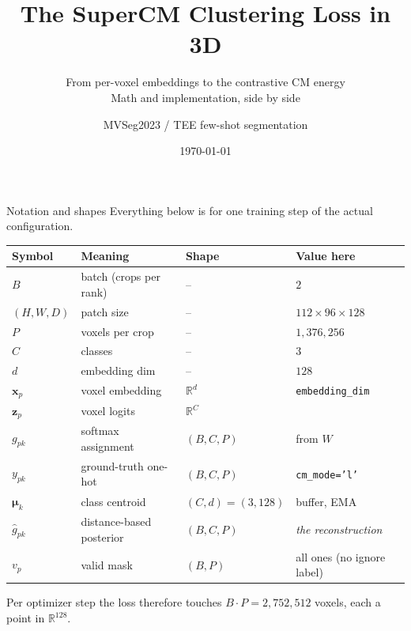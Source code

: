 \documentclass[10pt,aspectratio=169]{beamer}
\title[SuperCM 3D]{The SuperCM Clustering Loss in 3D}
\subtitle{From per-voxel embeddings to the contrastive CM energy\\
\small Math and implementation, side by side}
\author{MVSeg2023 / TEE few-shot segmentation}
\date{\today}
\newcommand{\xv}{\mathbf{x}}
\newcommand{\muv}{\boldsymbol{\mu}}
\newcommand{\zv}{\mathbf{z}}
\newcommand{\Rb}{\mathbb{R}}
\begin{document}
\begin{frame}
  \titlepage
\end{frame}

\begin{frame}{Notation and shapes}
\small
Everything below is for one training step of the actual configuration.

\begin{center}
\begin{tabular}{llll}
\toprule
Symbol & Meaning & Shape & Value here \\
\midrule
$B$                & batch (crops per rank)        & --                  & $2$ \\
$(H,W,D)$          & patch size                    & --                  & $112\times96\times128$ \\
$P$                & voxels per crop               & --                  & $1{,}376{,}256$ \\
$C$                & classes                       & --                  & $3$ \\
$d$                & embedding dim                 & --                  & $128$ \\
$\xv_p$            & voxel embedding               & $\Rb^{d}$           & \texttt{embedding\_dim} \\
$\zv_p$            & voxel logits                  & $\Rb^{C}$           & \\
$g_{pk}$           & softmax assignment            & $(B,C,P)$           & from $W$ \\
$y_{pk}$           & ground-truth one-hot          & $(B,C,P)$           & \texttt{cm\_mode='l'} \\
$\muv_k$           & class centroid                & $(C,d)=(3,128)$     & buffer, EMA \\
$\hat g_{pk}$      & distance-based posterior      & $(B,C,P)$           & \emph{the reconstruction} \\
$v_p$              & valid mask                    & $(B,P)$             & all ones (no ignore label) \\
\bottomrule
\end{tabular}
\end{center}

\vspace{0.4em}
Per optimizer step the loss therefore touches $B\cdot P = 2{,}752{,}512$ voxels, each a point in $\Rb^{128}$.
\end{frame}
\end{document}
